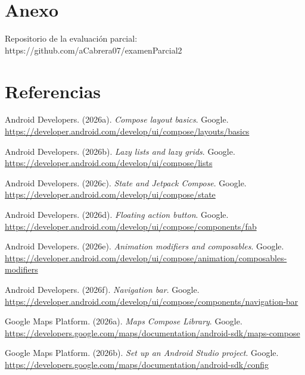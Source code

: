 \documentclass[12pt,a4paper]{article}
\begin{document}
\clearpage
\section{Anexo}
Repositorio de la evaluación parcial: 
https://github.com/aCabrera07/examenParcial2
\vfill
\clearpage
\section{Referencias}

\setlength{\parindent}{0pt}

Android Developers. (2026a). \textit{Compose layout basics}. Google.\\
\url{https://developer.android.com/develop/ui/compose/layouts/basics}

Android Developers. (2026b). \textit{Lazy lists and lazy grids}. Google.\\
\url{https://developer.android.com/develop/ui/compose/lists}

Android Developers. (2026c). \textit{State and Jetpack Compose}. Google.\\
\url{https://developer.android.com/develop/ui/compose/state}

Android Developers. (2026d). \textit{Floating action button}. Google.\\
\url{https://developer.android.com/develop/ui/compose/components/fab}

Android Developers. (2026e). \textit{Animation modifiers and composables}. Google.\\
\url{https://developer.android.com/develop/ui/compose/animation/composables-modifiers}

Android Developers. (2026f). \textit{Navigation bar}. Google.\\
\url{https://developer.android.com/develop/ui/compose/components/navigation-bar}

Google Maps Platform. (2026a). \textit{Maps Compose Library}. Google.\\
\url{https://developers.google.com/maps/documentation/android-sdk/maps-compose}

Google Maps Platform. (2026b). \textit{Set up an Android Studio project}. Google.\\
\url{https://developers.google.com/maps/documentation/android-sdk/config}
\end{document}
